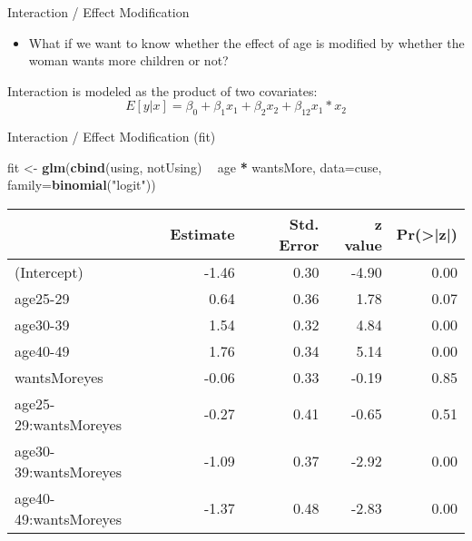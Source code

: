 \documentclass[
  ignorenonframetext,
]{beamer}
\newenvironment{Shaded}{\begin{snugshade}}{\end{snugshade}}
\newcommand{\DataTypeTok}[1]{\textcolor[rgb]{0.13,0.29,0.53}{#1}}
\newcommand{\KeywordTok}[1]{\textcolor[rgb]{0.13,0.29,0.53}{\textbf{#1}}}
\newcommand{\NormalTok}[1]{#1}
\newcommand{\OperatorTok}[1]{\textcolor[rgb]{0.81,0.36,0.00}{\textbf{#1}}}
\newcommand{\StringTok}[1]{\textcolor[rgb]{0.31,0.60,0.02}{#1}}
\providecommand{\tightlist}{%
  \setlength{\itemsep}{0pt}\setlength{\parskip}{0pt}}
\begin{document}
\begin{frame}{Interaction / Effect Modification}
\protect\hypertarget{interaction-effect-modification}{}

\begin{itemize}
\tightlist
\item
  What if we want to know whether the effect of age is modified by
  whether the woman wants more children or not?
\end{itemize}

Interaction is modeled as the product of two covariates: \[
E[y|x] = \beta_0 + \beta_1 x_1 + \beta_2 x_2 + \beta_{12} x_1*x_2
\]

\end{frame}

\begin{frame}[fragile]{Interaction / Effect Modification (fit)}
\protect\hypertarget{interaction-effect-modification-fit}{}

\begin{Shaded}
\begin{Highlighting}[]
\NormalTok{fit <-}\StringTok{ }\KeywordTok{glm}\NormalTok{(}\KeywordTok{cbind}\NormalTok{(using, notUsing) }\OperatorTok{~}\StringTok{ }\NormalTok{age }\OperatorTok{*}\StringTok{ }\NormalTok{wantsMore, }
           \DataTypeTok{data=}\NormalTok{cuse, }\DataTypeTok{family=}\KeywordTok{binomial}\NormalTok{(}\StringTok{"logit"}\NormalTok{))}
\end{Highlighting}
\end{Shaded}

\tiny
\begin{table}[H]
\centering
\begin{tabular}[t]{l|r|r|r|r}
\hline
  & Estimate & Std. Error & z value & Pr(>|z|)\\
\hline
(Intercept) & -1.46 & 0.30 & -4.90 & 0.00\\
\hline
age25-29 & 0.64 & 0.36 & 1.78 & 0.07\\
\hline
age30-39 & 1.54 & 0.32 & 4.84 & 0.00\\
\hline
age40-49 & 1.76 & 0.34 & 5.14 & 0.00\\
\hline
wantsMoreyes & -0.06 & 0.33 & -0.19 & 0.85\\
\hline
age25-29:wantsMoreyes & -0.27 & 0.41 & -0.65 & 0.51\\
\hline
age30-39:wantsMoreyes & -1.09 & 0.37 & -2.92 & 0.00\\
\hline
age40-49:wantsMoreyes & -1.37 & 0.48 & -2.83 & 0.00\\
\hline
\end{tabular}
\end{table}

\end{frame}
\end{document}
